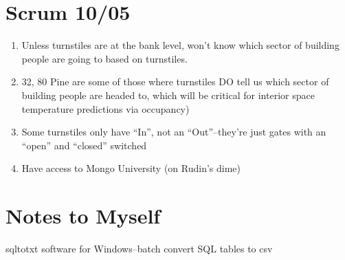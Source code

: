 \documentclass[12pt,a4paper]{article}
\begin{document}
\section{Scrum 10/05}
\begin{enumerate}
	\item Unless turnstiles are at the bank level, won't know which sector of
		building people are going to based on turnstiles.
	\item 32, 80 Pine are some of
		those where turnstiles DO tell us which sector of building people are
		headed to, which will be critical for interior space temperature
		predictions via occupancy)
	\item Some turnstiles only have ``In'', not an ``Out''--they're just gates
		with an ``open'' and ``closed'' switched
	\item Have access to Mongo University (on Rudin's dime)
\end{enumerate}
\section{Notes to Myself}
sqltotxt software for Windows--batch convert SQL tables to csv
\end{document}
